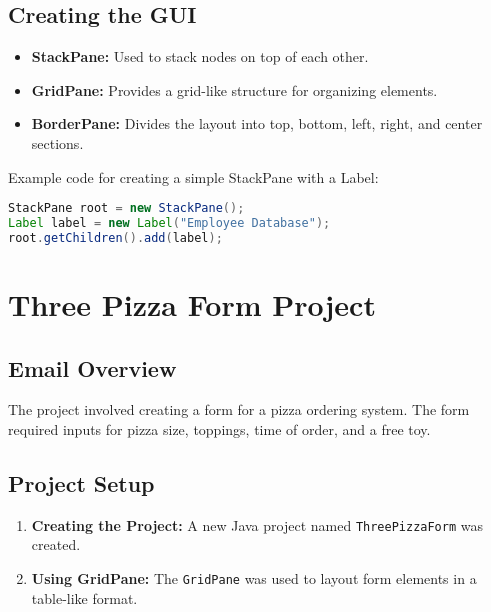 \documentclass{article}
\begin{document}
\subsection{Creating the GUI}
\begin{itemize}
    \item \textbf{StackPane:} Used to stack nodes on top of each other.
    \item \textbf{GridPane:} Provides a grid-like structure for organizing elements.
    \item \textbf{BorderPane:} Divides the layout into top, bottom, left, right, and center sections.
\end{itemize}
Example code for creating a simple StackPane with a Label:
\begin{lstlisting}[language=Java]
StackPane root = new StackPane();
Label label = new Label("Employee Database");
root.getChildren().add(label);
\end{lstlisting}

\section{Three Pizza Form Project}
\subsection{Email Overview}
The project involved creating a form for a pizza ordering system. The form required inputs for pizza size, toppings, time of order, and a free toy.

\subsection{Project Setup}
\begin{enumerate}
    \item \textbf{Creating the Project:} A new Java project named \texttt{ThreePizzaForm} was created.
    \item \textbf{Using GridPane:} The \texttt{GridPane} was used to layout form elements in a table-like format.
\end{enumerate}
\end{document}
